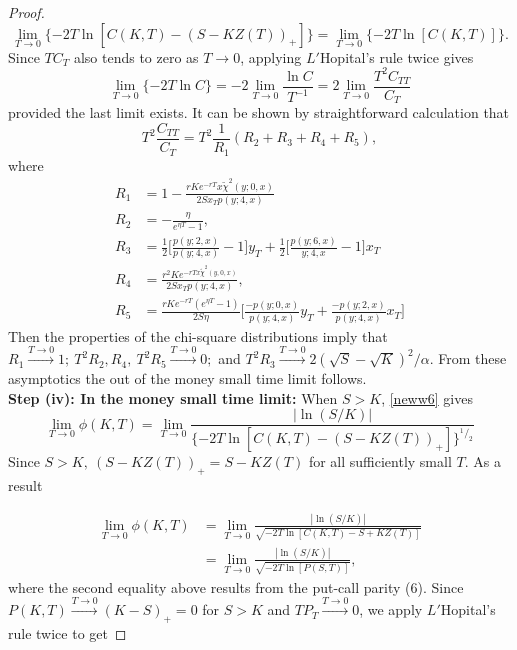\documentclass[a4 paper, 12pt]{report}
\newcommand*\rfrac[2]{{}^{#1}\!/_{#2}}
\theoremstyle{plain}
\begin{document}
\begin{proof}
\begin{equation}\label{34}
\lim_{T\rightarrow 0}\{-2T\ln[C(K,T) - (S-KZ(T))_+]\} = \lim_{T\rightarrow 0}\{-2T\ln[C(K,T)]\}.
\end{equation}
Since $TC_T$ also tends to zero as $T\rightarrow 0$, applying $L'$Hopital's rule twice gives
$$
\lim_{T\rightarrow 0}\{-2T\ln C\} = -2\lim_{T\rightarrow 0}\frac{\ln C}{T^{-1}} = 2\lim_{T\rightarrow 0}\frac{T^2C_{TT}}{C_T}
$$
provided the last limit exists. It can be shown by straightforward calculation that
$$
T^2\frac{C_{TT}}{C_T} = T^2\frac{1}{R_1}(R_2+R_3+R_4+R_5),
$$
where
\begin{align*}
R_1& = 1 - \frac{rKe^{-rT}x\tilde{\chi}^2(y;0,x)}{2Sx_Tp(y;4,x)}\\
R_2& = -\frac{\eta}{e^{\eta T} - 1},\\
R_3& = \frac{1}{2}\bigg[\frac{p(y;2,x)}{p(y;4,x)} - 1\bigg]y_T+\frac{1}{2}\bigg[\frac{p(y;6,x)}{y;4,x} - 1\bigg]x_T\\
R_4& = \frac{r^2 Ke^{-rTx\tilde{\chi}^2(y,0,x)}}{2Sx_Tp(y;4,x)},\\
R_5& = \frac{rKe^{-rT}(e^{\eta T} - 1)}{2S\eta}\bigg[\frac{-p(y;0,x)}{p(y;4,x)}y_T+\frac{-p(y;2,x)}{p(y;4,x)}x_T\bigg]
\end{align*}
Then the properties of the chi-square distributions imply that $R_1\stackrel{T\rightarrow 0}{\longrightarrow} 1; ~T^2R_2, R_4,~T^2R_5\stackrel{T\rightarrow 0}{\longrightarrow}0;$ and $T^2R_3\stackrel{T\rightarrow 0}{\longrightarrow}2(\sqrt{S} - \sqrt{K})^2/\alpha$. From these asymptotics the out of the money small time limit follows.\\

\textbf{Step (iv): In the money small time limit:} When $S>K$, \eqref{neww6} gives
$$
\lim_{T\rightarrow 0}\phi(K,T) = \lim_{T\rightarrow 0}\frac{|\ln(S/K)|}{\{-2T\ln[C(K,T) - (S-KZ(T))_+]\}^{\rfrac{1}{2}}}
$$
Since $S>K,~ (S-KZ(T))_+ = S-KZ(T)$ for all sufficiently small $T$. As a result

\begin{equation}\label{35}
\begin{split}
\lim_{T\rightarrow 0}\phi(K,T)& = \lim_{T\rightarrow 0}\frac{|\ln(S/K)|}{\sqrt{-2T\ln[C(K,T) - S + KZ(T)]}}\\
& = \lim_{T\rightarrow 0}\frac{|\ln(S/K)|}{\sqrt{-2T\ln[P(S,T)]}},
\end{split}
\end{equation}
where the second equality above results from the put-call parity (6). Since $P(K,T)\stackrel{T\rightarrow 0}{\longrightarrow}(K-S)_+ = 0$ for $S>K$ and $TP_T\stackrel{T\rightarrow 0}{\longrightarrow}0$, we apply $L'$Hopital's rule twice to get


\end{proof}
\end{document}
